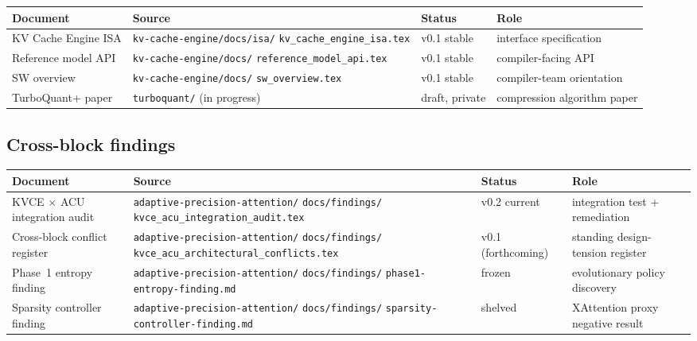 \documentclass[11pt]{article}
\begin{document}
\begin{center}
\renewcommand{\arraystretch}{1.2}
\setlength{\tabcolsep}{4pt}
\begin{tabular}{@{}p{}p{}lp{}@{}}
\toprule
\textbf{Document} & \textbf{Source} & \textbf{Status} & \textbf{Role} \\
\midrule
KV Cache Engine ISA       & \texttt{kv-cache-engine/docs/isa/}
                            \texttt{kv\_cache\_engine\_isa.tex}
  & v0.1 stable & interface specification \\
Reference model API       & \texttt{kv-cache-engine/docs/}
                            \texttt{reference\_model\_api.tex}
  & v0.1 stable & compiler-facing API \\
SW overview               & \texttt{kv-cache-engine/docs/}
                            \texttt{sw\_overview.tex}
  & v0.1 stable & compiler-team orientation \\
TurboQuant+ paper         & \texttt{turboquant/} (in progress)
  & draft, private & compression algorithm paper \\
\bottomrule
\end{tabular}
\end{center}

\subsection{Cross-block findings}

\begin{center}
\renewcommand{\arraystretch}{1.2}
\setlength{\tabcolsep}{4pt}
\begin{tabular}{@{}p{}p{}lp{}@{}}
\toprule
\textbf{Document} & \textbf{Source} & \textbf{Status} & \textbf{Role} \\
\midrule
KVCE $\times$ ACU integration audit & \texttt{adaptive-precision-attention/}
                                  \texttt{docs/findings/}
                                  \texttt{kvce\_acu\_integration\_audit.tex}
  & v0.2 current & integration test + remediation \\
Cross-block conflict register      & \texttt{adaptive-precision-attention/}
                                  \texttt{docs/findings/}
                                  \texttt{kvce\_acu\_architectural\_conflicts.tex}
  & v0.1 (forthcoming) & standing design-tension register \\
Phase~1 entropy finding            & \texttt{adaptive-precision-attention/}
                                  \texttt{docs/findings/}
                                  \texttt{phase1-entropy-finding.md}
  & frozen & evolutionary policy discovery \\
Sparsity controller finding        & \texttt{adaptive-precision-attention/}
                                  \texttt{docs/findings/}
                                  \texttt{sparsity-controller-finding.md}
  & shelved & XAttention proxy negative result \\
\bottomrule
\end{tabular}
\end{center}
\end{document}

